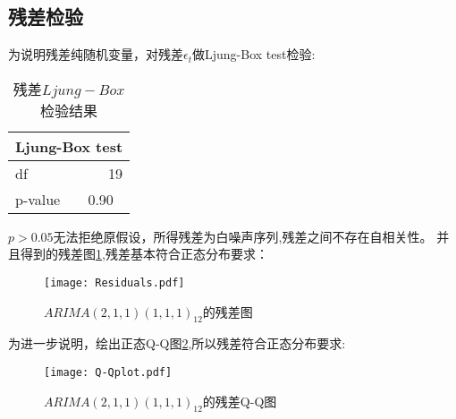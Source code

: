 \documentclass[12pt,a4paper]{nmmcm}
\begin{document}
  \subsection{残差检验}
  为说明残差纯随机变量，对残差\(\epsilon_t\)做Ljung-Box test检验:
  \begin{table}[H]
    \centering
    \caption{残差\(Ljung-Box\)检验结果}
      \begin{tabular}{l|l}
      \multicolumn{2}{c}{Ljung-Box test} \\
      \hline
      df    & \multicolumn{1}{r}{19} \\
      p-value & 0.90 \\
      \end{tabular}%
    \label{Ljung-Box of Residuals}%
  \end{table}%
  \(p>0.05\)无法拒绝原假设，所得残差为白噪声序列,残差之间不存在自相关性。
  并且得到的残差图\ref{Redsiduals},残差基本符合正态分布要求：
  \begin{figure}[H] %
  \centering %
  \texttt{[image: Residuals.pdf]} %
  \caption{\(ARIMA(2,1,1)(1,1,1)_{12}\)的残差图} %
  \label{Redsiduals} %
  \end{figure} 
  为进一步说明，绘出正态Q-Q图\ref{Q-Qplot},所以残差符合正态分布要求:
  \begin{figure}[H] %
    \centering %
    \texttt{[image: Q-Qplot.pdf]} %
    \caption{\(ARIMA(2,1,1)(1,1,1)_{12}\)的残差Q-Q图} %
    \label{Q-Qplot} %
  \end{figure} 
\end{document}
